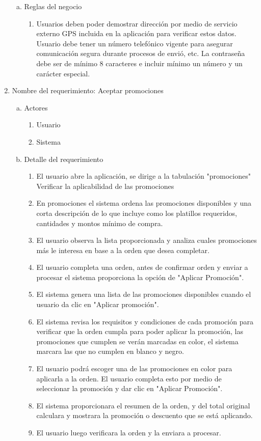 \documentclass[conference]{IEEEtran}
\begin{document}
\begin{enumerate}
\begin{enumerate}[a)]
\item Reglas del negocio
\begin{enumerate}[a]
\item Usuarios deben poder demostrar dirección por medio de servicio externo GPS incluida en la aplicación para verificar estos datos. Usuario debe tener un número telefónico vigente para asegurar comunicación segura durante procesos de envió, etc. La contraseña debe ser de mínimo 8 caracteres e incluir mínimo un número y un carácter especial.
\end{enumerate}
\end{enumerate}

\item Nombre del requerimiento: Aceptar promociones
\begin{enumerate}[a)]
\item Actores
	\begin{enumerate}[a]
	\item Usuario
	\item Sistema
	\end{enumerate}
\item Detalle del requerimiento
	\begin{enumerate}[P{a}so 1.]
	
\item El usuario abre la aplicación, se dirige a la tabulación "promociones" Verificar la aplicabilidad de las promociones
\item En promociones el sistema ordena las promociones disponibles y una corta descripción de lo que incluye como los platillos requeridos, cantidades y montos mínimo de compra.
\item El usuario observa la lista proporcionada y analiza cuales promociones más le interesa en base a la orden que desea completar.
\item El usuario completa una orden, antes de confirmar orden y enviar a procesar el sistema proporciona la opción de "Aplicar Promoción".
\item El sistema genera una lista de las promociones disponibles cuando el usuario da clic en "Aplicar promoción".
\item El sistema revisa los requisitos y condiciones de cada promoción para verificar que la orden cumpla para poder aplicar la promoción, las promociones que cumplen se verán marcadas en color, el sistema marcara las que no cumplen en blanco y negro.
\item El usuario podrá escoger una de las promociones en color para aplicarla a la orden. El usuario completa esto por medio de seleccionar la promoción y dar clic en "Aplicar Promoción".
\item El sistema proporcionara el resumen de la orden, y del total original calculara y mostrara la promoción o descuento que se está aplicando.
\item El usuario luego verificara la orden y la enviara a procesar.


\end{enumerate}
\end{enumerate}
\end{enumerate}
\end{document}
